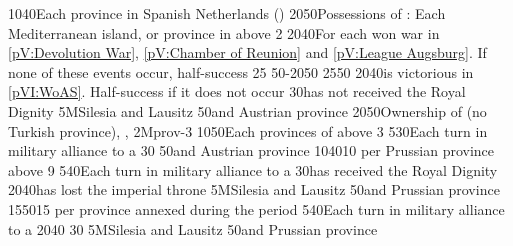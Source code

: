{10}{40}{Each province in Spanish Netherlands (\regionBelgique)}%
%
%
{20}{50}{Possessions of : Each Mediterranean island, or province
  in  above 2}%
%
%
{20}{40}{For each won war in \ref{pV:Devolution War}, \ref{pV:Chamber of
    Reunion} and \ref{pV:League Augsburg}. If none of these events occur,
  half-success}%
%
%
{}{25}{}%
%
%
%
{50-20}{50}{}%
%
%
{25}{50}{\EU@objWoSS}%
%
%
{20}{40}{\AUS is victorious in \ref{pVI:WoAS}. Half-success if it does not
  occur}%
%
%
{}{30}{\paysmajeurPrusse has not received the Royal Dignity}%
%
\EUobjective5M{Silesia and Lausitz}{}%
{}{50}{\provinceSilesie and \provinceLausitz Austrian province}%
%
%
%
{20}{50}{Ownership of \payshongrie (no Turkish province), \provinceBosna,
  \provinceSerbia}%
%
\EUobjective2M{\paysnaples}{prov-3}%
{10}{50}{Each provinces of \paysnaples above 3}%
%
%
{5}{30}{Each turn in military alliance to a \MAJ}%
%
%
{}{30}{\EU@objFranceContained}%
%
%
{}{50}{\provinceSilesie and \provinceLausitz Austrian province}%
%
 
%
%
{10}{40}{10 \VPs per Prussian province above 9}%
%
%
{5}{40}{Each turn in military alliance to a \MAJ}%
%
%
{}{30}{\paysmajeurPrusse has received the Royal Dignity}%
%
%
{20}{40}{\AUS has lost the imperial throne}%
%
\EUobjective5M{Silesia and Lausitz}{}%
{}{50}{\provinceSilesie and \provinceLausitz Prussian province}%
%
%
%
{15}{50}{15 \VPs per province annexed during the period}%
%
%
{5}{40}{Each turn in military alliance to a \MAJ}%
%
%
{20}{40}{\EU@objSYW}
%
%
{}{30}{\EU@objFranceContained}%
%
\EUobjective5M{Silesia and Lausitz}{}%
{}{50}{\provinceSilesie and \provinceLausitz Prussian province}%
